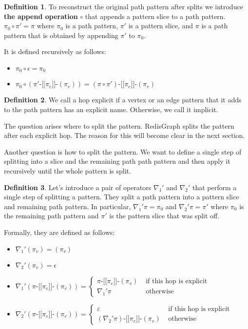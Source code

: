 \documentclass[14pt]{constructor-thesis}
\theoremstyle{definition}
\newtheorem{definition}{Definition}
\newcommand{\patternstart}[1]{(#1)}
\newcommand{\patternhop}[3]{#1 \texttt{-[[} #2 \texttt{]]-} (#3)}
\begin{document}
\begin{definition}
  To reconstruct the original path pattern after splits we introduce \textbf{the append operation} $\circ$ that appends a pattern slice to a path pattern. 
  $\pi_0 \circ \pi' = \pi$ where $\pi_0$ is a path pattern, $\pi'$ is a pattern slice, and $\pi$ is a path pattern that is obtained by appending $\pi'$ to $\pi_0$.

  It is defined recursively as follows:
  \begin{itemize}
    \item $\pi_0 \circ \epsilon = \pi_0$
    \item $\pi_0 \circ (\patternhop{\pi'}{\pi_e}{\pi_v}) = \patternhop{(\pi \circ \pi')}{\pi_e}{\pi_v}$
  \end{itemize}

\end{definition}

\begin{definition}
  We call a hop explicit if a vertex or an edge pattern that it adds to the path pattern has an explicit name. Otherwise, we call it implicit.
\end{definition}

The question arises where to split the pattern. RedisGraph splits the pattern after each explicit hop. The reason for this will become clear in the next section.

Another question is how to split the pattern. We want to define a single step of splitting into a slice and the remaining path path pattern and then apply it recursively until the whole pattern is split.

\begin{definition}
  Let's introduce a pair of operators $\nabla_1'$ and $\nabla_2'$ that perform a single step of splitting a pattern. They split a path pattern into a pattern slice and remaining path pattern. In particular, $\nabla_1' \pi = \pi_0$ and $\nabla_2' \pi = \pi'$ where $\pi_0$ is the remaining path pattern and $\pi'$ is the pattern slice that was split off.

  Formally, they are defined as follows:
  \begin{itemize}
    \item $\nabla_1' \patternstart{\pi_v} = \patternstart{\pi_v}$
    \item $\nabla_2' \patternstart{\pi_v} = \epsilon$
    \item $\nabla_1' (\patternhop{\pi}{\pi_e}{\pi_v}) =
    \begin{cases}
      \patternhop{\pi}{\pi_e}{\pi_v} & \text{ if this hop is explicit} \\
      \nabla_1' \pi & \text{ otherwise}
    \end{cases} $
    \item $\nabla_2' (\patternhop{\pi}{\pi_e}{\pi_v}) =
    \begin{cases}
      \varepsilon & \text{ if this hop is explicit} \\
      \patternhop{(\nabla_2' \pi)}{\pi_e}{\pi_v} & \text{ otherwise}
    \end{cases} $
  \end{itemize}
\end{definition}
\end{document}
